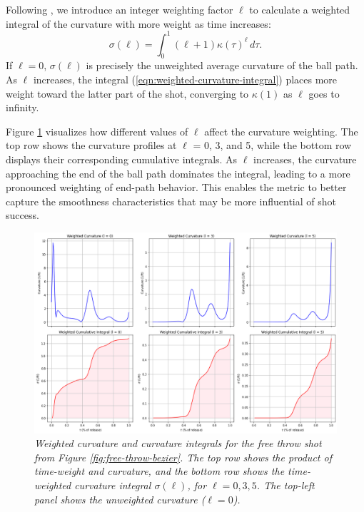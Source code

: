 \documentclass{article}
\begin{document}
          Following \citet{slegers_role_2024}, we introduce an integer weighting factor $\ell$ to calculate a weighted integral of the curvature with more weight as time increases:
          \begin{equation}
          \label{eqn:weighted-curvature-integral}
            \sigma(\ell) = \int_{0}^{1} (\ell + 1) \kappa(\tau)^\ell \, d\tau.
          \end{equation}
          If \(\ell = 0\), \(\sigma(\ell)\) is precisely the unweighted average curvature of the ball path. As $\ell$ increases, the integral (\ref{eqn:weighted-curvature-integral}) places more weight toward the latter part of the shot, converging to \(\kappa(1)\) as $\ell$ goes to infinity. 
    
          Figure \ref{fig:weights} visualizes how different values of $\ell$ affect the curvature weighting. The top row shows the curvature profiles at $\ell$ = 0, 3, and 5, while the bottom row displays their corresponding cumulative integrals. As $\ell$ increases, the curvature approaching the end of the ball path dominates the integral, leading to a more pronounced weighting of end-path behavior. This enables the metric to better capture the smoothness characteristics that may be more influential of shot success.

          \begin{figure}[H]
              \centering
              \includegraphics[width=0.8\linewidth]{reports/arxiv/weights.png}
              \caption{\it Weighted curvature and curvature integrals for the free throw shot from Figure \ref{fig:free-throw-bezier}. The top row shows the product of time-weight and curvature, and the bottom row shows the time-weighted curvature integral \(\sigma(\ell)\), for \(\ell = 0, 3, 5\). The top-left panel shows the unweighted curvature (\(\ell = 0\)).}
              \label{fig:weights}
          \end{figure}
\end{document}
